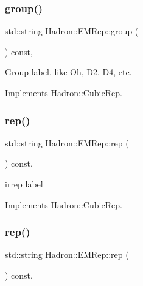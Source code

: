 \subsubsection{\texorpdfstring{group()}{group()}\hspace{0.1cm}{\footnotesize\ttfamily [3/3]}}
{\footnotesize\ttfamily std\+::string Hadron\+::\+E\+M\+Rep\+::group (\begin{DoxyParamCaption}{ }\end{DoxyParamCaption}) const\hspace{0.3cm}{\ttfamily [inline]}, {\ttfamily [virtual]}}

Group label, like Oh, D2, D4, etc. 

Implements \mbox{\hyperlink{structHadron_1_1CubicRep_a0748f11ec87f387062c8e8981339a29c}{Hadron\+::\+Cubic\+Rep}}.

\mbox{\label{structHadron_1_1EMRep_a38de805af0f4c022d2b7f70ac03c62ce}} 
\subsubsection{\texorpdfstring{rep()}{rep()}\hspace{0.1cm}{\footnotesize\ttfamily [1/3]}}
{\footnotesize\ttfamily std\+::string Hadron\+::\+E\+M\+Rep\+::rep (\begin{DoxyParamCaption}{ }\end{DoxyParamCaption}) const\hspace{0.3cm}{\ttfamily [inline]}, {\ttfamily [virtual]}}

irrep label 

Implements \mbox{\hyperlink{structHadron_1_1CubicRep_ac3eb63608803d44c68681f158e14eb1b}{Hadron\+::\+Cubic\+Rep}}.

\mbox{\label{structHadron_1_1EMRep_a38de805af0f4c022d2b7f70ac03c62ce}} 
\subsubsection{\texorpdfstring{rep()}{rep()}\hspace{0.1cm}{\footnotesize\ttfamily [2/3]}}
{\footnotesize\ttfamily std\+::string Hadron\+::\+E\+M\+Rep\+::rep (\begin{DoxyParamCaption}{ }\end{DoxyParamCaption}) const\hspace{0.3cm}{\ttfamily [inline]}, {\ttfamily [virtual]}}

